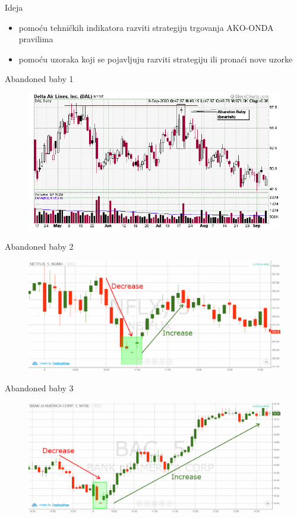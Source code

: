 \documentclass{beamer}
\begin{document}
\begin{frame}{Ideja}
\begin{itemize}
  \item pomoću tehničkih indikatora razviti strategiju trgovanja AKO-ONDA pravilima
  \item pomoću uzoraka koji se pojavljuju razviti strategiju ili pronaći nove uzorke
\end{itemize}
\end{frame}

\begin{frame}{Abandoned baby 1}
\begin{figure}[h]
  \includegraphics[width=\textwidth]{img/baby1.png}
\end{figure}
\end{frame}

\begin{frame}{Abandoned baby 2}
\begin{figure}[h]
  \includegraphics[width=\textwidth]{img/baby2.png}
\end{figure}
\end{frame}

\begin{frame}{Abandoned baby 3}
\begin{figure}[h]
  \includegraphics[width=\textwidth]{img/baby3.png}
\end{figure}
\end{frame}
\end{document}
